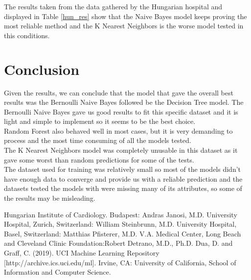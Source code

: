 \documentclass[conference]{IEEEtran}
\begin{document}
The results taken from the data gathered by the Hungarian hospital\cite{hun} and displayed in Table \ref{hun_res} show that the Naive Bayes model keeps proving the most reliable method and the K Nearest Neighbors is the worse model tested in this conditions.

\section{Conclusion}

Given the results, we can conclude that the model that gave the overall best results was the Bernoulli Naive Bayes followed be the Decision Tree model. The Bernoulli Naive Bayes gave us good results to fit this specific dataset and it is light and simple to implement so it seems to be the best choice.
\\Random Forest also behaved well in most cases, but it is very demanding to process and the most time consuming of all the models tested.
\\The K Nearest Neighbors model was completely unusable in this dataset as it gave some worst than random predictions for some of the tests.
\\The dataset used for training was relatively small so most of the models didn't have enough data to converge and provide us with a reliable prediction and the datasets tested the models with were missing many of its attributes, so some of the results may be misleading.

\begin{thebibliography}{00}
     Hungarian Institute of Cardiology. Budapest: Andras Janosi, M.D.
     University Hospital, Zurich, Switzerland: William Steinbrunn, M.D.
     University Hospital, Basel, Switzerland: Matthias Pfisterer, M.D.
     V.A. Medical Center, Long Beach and Cleveland Clinic Foundation:Robert Detrano, M.D., Ph.D.
     Dua, D. and Graff, C. (2019). UCI Machine Learning Repository [http://archive.ics.uci.edu/ml]. Irvine, CA: University of California, School of Information and Computer Science.
\end{thebibliography}
\end{document}
